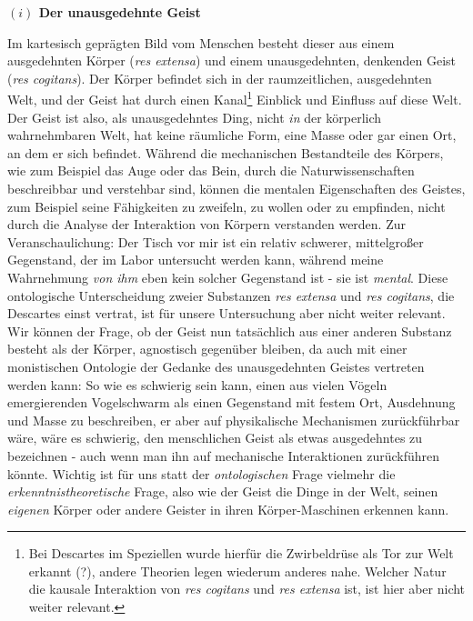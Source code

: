 \documentclass[a4paper, 12pt]{article}
\begin{document}
\begin{onehalfspace}
\vspace{5mm}
\noindent\textbf{$(i)$ Der unausgedehnte Geist}



\noindent Im kartesisch geprägten Bild vom Menschen besteht dieser aus einem ausgedehnten Körper (\emph{res extensa}) und einem unausgedehnten, denkenden Geist (\emph{res cogitans}). Der Körper befindet sich in der raumzeitlichen, ausgedehnten Welt, und der Geist hat durch einen Kanal\footnote{Bei Descartes im Speziellen wurde hierfür die Zwirbeldrüse als Tor zur Welt erkannt (?), andere Theorien legen wiederum anderes nahe. Welcher Natur die kausale Interaktion von \emph{res cogitans} und \emph{res extensa} ist, ist hier aber nicht weiter relevant.} Einblick und Einfluss auf diese Welt. Der Geist ist also, als unausgedehntes Ding, nicht \emph{in} der körperlich wahrnehmbaren Welt, hat keine räumliche Form, eine Masse oder gar einen Ort, an dem er sich befindet. Während die mechanischen Bestandteile des Körpers, wie zum Beispiel das Auge oder das Bein, durch die Naturwissenschaften beschreibbar und verstehbar sind, können die mentalen Eigenschaften des Geistes, zum Beispiel seine Fähigkeiten zu zweifeln, zu wollen oder zu empfinden, nicht durch die Analyse der Interaktion von Körpern verstanden werden. Zur Veranschaulichung:  Der Tisch vor mir ist ein relativ schwerer, mittelgroßer Gegenstand, der im Labor untersucht werden kann, während meine Wahrnehmung \emph{von ihm} eben kein solcher Gegenstand ist - sie ist \emph{mental}. Diese ontologische Unterscheidung zweier Substanzen \emph{res extensa} und \emph{res cogitans}, die Descartes einst vertrat, ist für unsere Untersuchung aber nicht weiter relevant. Wir können der Frage, ob der Geist nun tatsächlich aus einer anderen Substanz besteht als der Körper, agnostisch gegenüber bleiben, da auch mit einer monistischen Ontologie der Gedanke des unausgedehnten Geistes vertreten werden kann: So wie es schwierig sein kann, einen aus vielen Vögeln emergierenden Vogelschwarm als einen Gegenstand mit festem Ort, Ausdehnung und Masse zu beschreiben, er aber auf physikalische Mechanismen zurückführbar wäre, wäre es schwierig, den menschlichen Geist als etwas ausgedehntes zu bezeichnen - auch wenn man ihn auf mechanische Interaktionen zurückführen könnte. Wichtig ist für uns statt der \emph{ontologischen} Frage vielmehr die \emph{erkenntnistheoretische} Frage, also wie der Geist die Dinge in der Welt, seinen \emph{eigenen} Körper oder andere Geister in ihren Körper-Maschinen erkennen kann.


\end{onehalfspace}
\end{document}
